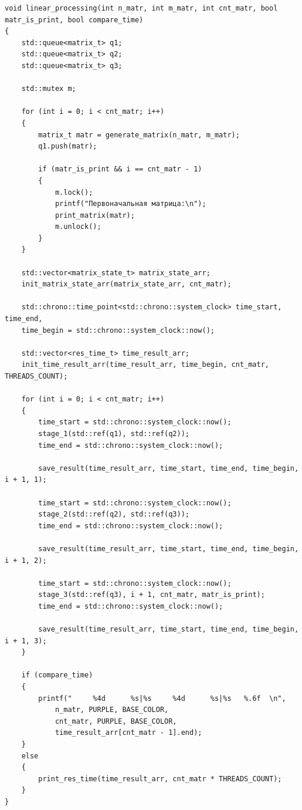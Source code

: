 \documentclass[a4paper,14pt, unknownkeysallowed]{extreport}
\begin{document}
\begin{center}
\captionsetup{justification=raggedright,singlelinecheck=off}
\begin{lstlisting}[label=lst:linear_processing,caption=Функция алгоритма линейной обработки матрицы]
void linear_processing(int n_matr, int m_matr, int cnt_matr, bool matr_is_print, bool compare_time)
{
	std::queue<matrix_t> q1;
	std::queue<matrix_t> q2;
	std::queue<matrix_t> q3;

	std::mutex m;

	for (int i = 0; i < cnt_matr; i++)
	{
		matrix_t matr = generate_matrix(n_matr, m_matr);
		q1.push(matr);

		if (matr_is_print && i == cnt_matr - 1)
		{
			m.lock();
			printf("Первоначальная матрица:\n");
			print_matrix(matr);
			m.unlock();
		}
	}

	std::vector<matrix_state_t> matrix_state_arr;
	init_matrix_state_arr(matrix_state_arr, cnt_matr);

	std::chrono::time_point<std::chrono::system_clock> time_start, time_end, 
	time_begin = std::chrono::system_clock::now();

	std::vector<res_time_t> time_result_arr;
	init_time_result_arr(time_result_arr, time_begin, cnt_matr, THREADS_COUNT);

	for (int i = 0; i < cnt_matr; i++)
	{
		time_start = std::chrono::system_clock::now();
		stage_1(std::ref(q1), std::ref(q2));
		time_end = std::chrono::system_clock::now();
		
		save_result(time_result_arr, time_start, time_end, time_begin, i + 1, 1);

		time_start = std::chrono::system_clock::now();
		stage_2(std::ref(q2), std::ref(q3));
		time_end = std::chrono::system_clock::now();

		save_result(time_result_arr, time_start, time_end, time_begin, i + 1, 2);

		time_start = std::chrono::system_clock::now();
		stage_3(std::ref(q3), i + 1, cnt_matr, matr_is_print);
		time_end = std::chrono::system_clock::now();

		save_result(time_result_arr, time_start, time_end, time_begin, i + 1, 3);
	}

	if (compare_time)
	{
		printf("     %4d      %s|%s     %4d      %s|%s   %.6f  \n",
			n_matr, PURPLE, BASE_COLOR, 
			cnt_matr, PURPLE, BASE_COLOR,
			time_result_arr[cnt_matr - 1].end);
	}
	else
	{
		print_res_time(time_result_arr, cnt_matr * THREADS_COUNT);
	}
}
\end{lstlisting}
\end{center}
\end{document}

